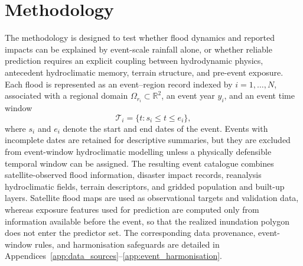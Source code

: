 \documentclass[pdflatex,sn-mathphys-ay]{sn-jnl}
\theoremstyle{thmstyleone}
\theoremstyle{thmstylethree}
\theoremstyle{thmstyletwo}
\begin{document}
\section{Methodology}
\label{sec:methodology}

The methodology is designed to test whether flood dynamics and
reported impacts can be explained by event-scale rainfall alone, or
whether reliable prediction requires an explicit coupling between
hydrodynamic physics, antecedent hydroclimatic memory, terrain
structure, and pre-event exposure.  Each flood is represented as an
event--region record indexed by $i=1,\ldots,N$, associated with a
regional domain $\Omega_{r_i}\subset\mathbb{R}^{2}$, an event year
$y_i$, and an event time window
\begin{equation}
  \mathcal{T}_{i}
  =
  \{t:s_i\leq t\leq e_i\},
  \label{eq:event_window}
\end{equation}
where $s_i$ and $e_i$ denote the start and end dates of the event.
Events with incomplete dates are retained for descriptive summaries,
but they are excluded from event-window hydroclimatic modelling unless
a physically defensible temporal window can be assigned.  The resulting
event catalogue combines satellite-observed flood information, disaster
impact records, reanalysis hydroclimatic fields, terrain descriptors,
and gridded population and built-up layers.  Satellite flood maps are
used as observational targets and validation data, whereas exposure
features used for prediction are computed only from information
available before the event, so that the realized inundation polygon does
not enter the predictor set.  The corresponding data provenance,
event-window rules, and harmonisation safeguards are detailed in
Appendices~\ref{app:data_sources}--\ref{app:event_harmonisation}.
\end{document}
